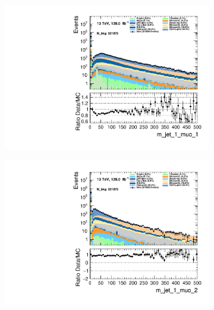 \begin{figure}
    \centering
    \begin{subfigure}{.49\textwidth}
        \includegraphics[width=\textwidth]{Figures/MC_Data_comp/m_jet_1_muo_1.pdf}
        \caption{}
        \label{fig:et}
    \end{subfigure}
    \hfill
    \begin{subfigure}{.49\textwidth}
        \includegraphics[width=\textwidth]{Figures/MC_Data_comp/m_jet_1_muo_2.pdf}
        \caption{ }
        \label{fig:flcp}
    \end{subfigure}
    \hfill 
    \begin{subfigure}{.49\textwidth}

\end{subfigure}
\end{figure}

